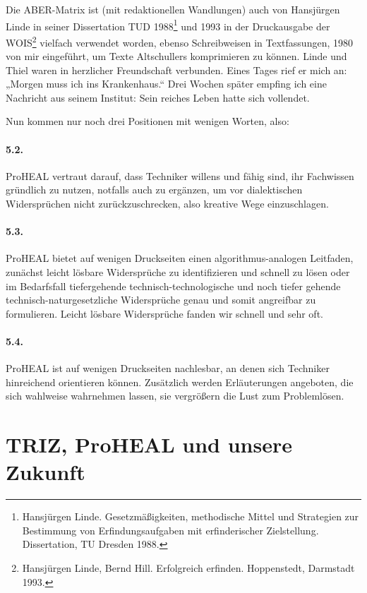 \documentclass[12pt,a4paper]{article}
\begin{document}
Die ABER-Matrix ist (mit redaktionellen Wandlungen) auch von Hansjürgen Linde
in seiner Dissertation TUD 1988\footnote{Hansjürgen Linde. Gesetzmäßigkeiten,
  methodische Mittel und Strategien zur Bestimmung von Erfindungsaufgaben mit
  erfinderischer Zielstellung.  Dissertation, TU Dresden 1988.} und 1993 in
der Druckausgabe der WOIS\footnote{Hansjürgen Linde, Bernd Hill. Erfolgreich
  erfinden. Hoppenstedt, Darmstadt 1993.} vielfach verwendet worden, ebenso
Schreibweisen in Textfassungen, 1980 von mir eingeführt, um Texte Altschullers
komprimieren zu können. Linde und Thiel waren in herzlicher Freundschaft
verbunden. Eines Tages rief er mich an: „Morgen muss ich ins Krankenhaus.“
Drei Wochen später empfing ich eine Nachricht aus seinem Institut: Sein
reiches Leben hatte sich vollendet.

Nun kommen nur noch drei Positionen mit wenigen Worten, also:

\paragraph{5.2.}
ProHEAL vertraut darauf, dass Techniker willens und fähig sind, ihr Fachwissen
gründlich zu nutzen, notfalls auch zu ergänzen, um vor dialektischen
Widersprüchen nicht zurückzuschrecken, also kreative Wege einzuschlagen.

\paragraph{5.3.}
ProHEAL bietet auf wenigen Druckseiten einen algorithmus-analogen Leitfaden,
zunächst leicht lösbare Widersprüche zu identifizieren und schnell zu lösen
oder im Bedarfsfall tiefergehende technisch-technologische und noch tiefer
gehende technisch-naturgesetz\-liche Widersprüche genau und somit angreifbar
zu formulieren. Leicht lösbare Widersprüche fanden wir schnell und sehr oft.

\paragraph{5.4.}
ProHEAL ist auf wenigen Druckseiten nachlesbar, an denen sich Techniker
hinreichend orientieren können. Zusätzlich werden Erläuterungen angeboten, die
sich wahlweise wahrnehmen lassen, sie vergrößern die Lust zum Problemlösen.

\section*{TRIZ, ProHEAL und unsere Zukunft}
\end{document}
